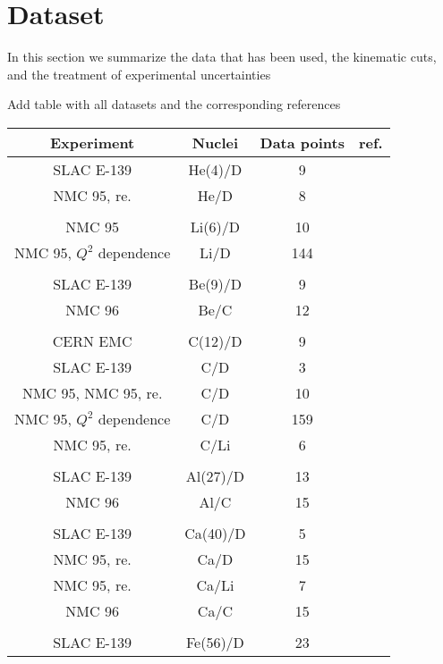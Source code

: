 
\section{Dataset}

In this section we summarize the data that has been used, the
kinematic cuts, and the treatment of experimental
uncertainties

Add table with all datasets and the corresponding references

\begin{table}
\centering
\begin{tabular}{c c c c}
\hline
\hline
Experiment & Nuclei & Data points & ref.\\
\hline
  SLAC E-139 & He(4)/D & 9 & \cite{PhysRevD.49.4348} \\
  NMC 95, re. & He/D & 8 & \cite{Amaudruz:1995tq}\\
\\
  NMC 95 & Li(6)/D & 10 & \cite{Arneodo:1995cs}\\
  NMC 95, $Q^2$ dependence & Li/D & 144 &\cite{Arneodo:1995cs}\\
\\
  SLAC E-139 & Be(9)/D & 9 & \cite{PhysRevD.49.4348}\\
  NMC 96 & Be/C & 12 & \cite{Arneodo:1996rv}\\
\\
  CERN EMC & C(12)/D & 9 & \cite{Ashman:1992kv}\\
  SLAC E-139 & C/D & 3 & \cite{PhysRevD.49.4348}\\
  NMC 95, NMC 95, re.  & C/D & 10 & \cite{Arneodo:1995cs,Amaudruz:1995tq}\\
  NMC 95, $Q^2$ dependence & C/D & 159 & \cite{Arneodo:1995cs}\\
  NMC 95, re. & C/Li & 6 & \cite{Amaudruz:1995tq}\\
\\
  SLAC E-139 & Al(27)/D & 13 & \cite{PhysRevD.49.4348}\\
  NMC 96 & Al/C & 15 & \cite{Arneodo:1996rv}\\
\\
  SLAC E-139 & Ca(40)/D & 5 & \cite{PhysRevD.49.4348}\\
  NMC 95, re. & Ca/D & 15 & \cite{Amaudruz:1995tq}\\
  NMC 95, re. & Ca/Li & 7 & \cite{Amaudruz:1995tq}\\
  NMC 96 & Ca/C & 15 & \cite{Arneodo:1996rv}\\
\\
  SLAC E-139 & Fe(56)/D & 23 & \cite{PhysRevD.49.4348}\\

\end{tabular}
\end{table}
